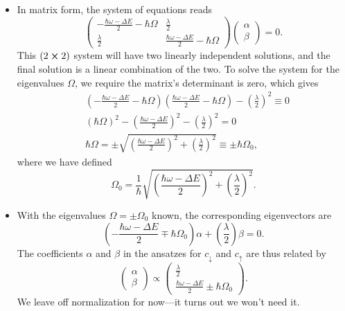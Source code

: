 \documentclass[11pt, a4paper]{article}
\newcommand{\ua}{\uparrow}  %
\newcommand{\da}{\downarrow}  %
\begin{document}
\begin{itemize}
	\item In matrix form, the system of equations reads
	\begin{equation*}
		\begin{pmatrix}
            -\frac{\hbar \omega - \Delta E}{2} - \hbar \Omega & \frac{\lambda}{2}\\[1mm]
			\frac{\lambda}{2} & \frac{\hbar \omega - \Delta E}{2} - \hbar \Omega
		\end{pmatrix}
		\begin{pmatrix}
		\alpha\\
		\beta
		\end{pmatrix}
		= 0.
	\end{equation*}
    This $ (2 \cross 2) $ system will have two linearly independent solutions, and the final solution is a linear combination of the two. To solve the system for the eigenvalues $ \Omega $, we require the matrix's determinant is zero, which gives
	\begin{align*}
		&\left(-\frac{\hbar \omega - \Delta E}{2} - \hbar \Omega\right)\left(\frac{\hbar \omega - \Delta E}{2} - \hbar \Omega\right) - \left(\frac{\lambda}{2}\right)^{2} \equiv 0\\
		&(\hbar \Omega)^{2} - \left(\frac{\hbar \omega - \Delta E}{2}\right)^{2} - \left(\frac{\lambda}{2}\right)^{2} = 0\\
		& \hbar \Omega = \pm \sqrt{\left(\frac{\hbar \omega - \Delta E}{2}\right)^{2} + \left(\frac{\lambda}{2}\right)^{2}} \equiv \pm \hbar \Omega_{0},
	\end{align*}
    where we have defined
    \begin{equation*}
        \Omega_{0} = \frac{1}{\hbar} \sqrt{\left(\frac{\hbar \omega - \Delta E}{2}\right)^{2} + \left(\frac{\lambda}{2}\right)^{2}}.
    \end{equation*}
    
    \item With the eigenvalues $ \Omega = \pm \Omega_{0} $ known, the corresponding eigenvectors are
	\begin{equation*}
		\left(- \frac{\hbar \omega - \Delta E}{2} \mp \hbar \Omega_{0}\right)\alpha + \left(\frac{\lambda}{2}\right)\beta = 0.
	\end{equation*}
    The coefficients $ \alpha $ and $ \beta $ in the ansatzes for $ c_{\da} $ and $ c_{\ua} $ are thus related by
	\begin{equation*}
		\begin{pmatrix}
			\alpha\\
			\beta
		\end{pmatrix}
		\propto
		\begin{pmatrix}
            \frac{\lambda}{2}\\[1mm]
			\frac{\hbar \omega - \Delta E}{2} \pm \hbar \Omega_{0}
		\end{pmatrix}.
	\end{equation*}
	We leave off normalization for now---it turns out we won't need it.
	

\end{itemize}
\end{document}
